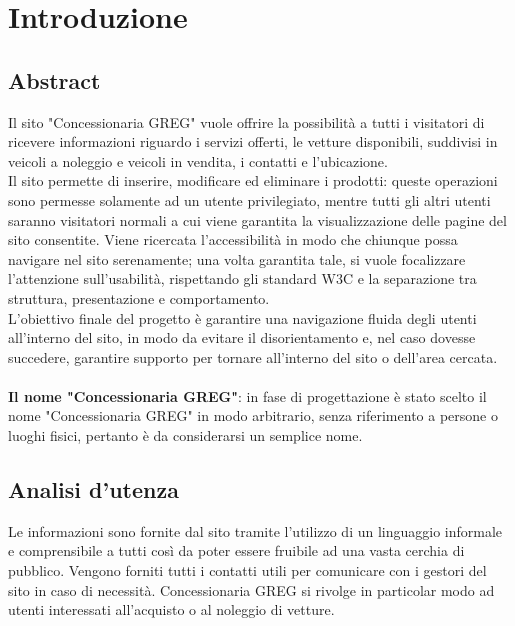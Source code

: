 \section{Introduzione}

\subsection{Abstract}
Il sito "Concessionaria GREG" vuole offrire la possibilità a tutti i visitatori di ricevere informazioni riguardo i servizi offerti, le vetture disponibili, suddivisi in veicoli a noleggio e veicoli in vendita, i contatti e l'ubicazione.\\

Il sito permette di inserire, modificare ed eliminare i prodotti: queste operazioni sono permesse solamente ad un utente privilegiato, mentre tutti gli altri utenti saranno visitatori normali a cui viene garantita la visualizzazione delle pagine del sito consentite. Viene ricercata l'accessibilità in modo che chiunque possa navigare nel sito serenamente; una volta garantita tale, si vuole focalizzare l'attenzione sull'usabilità, rispettando gli standard W3C e la separazione tra struttura, presentazione e comportamento.\\

L'obiettivo finale del progetto è garantire una navigazione fluida degli utenti all'interno del sito, in modo da evitare il disorientamento e, nel caso dovesse succedere, garantire supporto per tornare all'interno del sito o dell'area cercata.\\
\\
\textbf{Il nome "Concessionaria GREG"}: in fase di progettazione è stato scelto il nome "Concessionaria GREG" in modo arbitrario, senza riferimento a persone o luoghi fisici, pertanto è da considerarsi un semplice nome.\\

\subsection{Analisi d'utenza}
Le informazioni sono fornite dal sito tramite l'utilizzo di un linguaggio informale e comprensibile a tutti così da poter essere fruibile ad una vasta cerchia di pubblico. Vengono forniti tutti i contatti utili per comunicare con i gestori del sito in caso di necessità. Concessionaria GREG si rivolge in particolar modo ad utenti interessati all'acquisto o al noleggio di vetture.\\

\pagebreak